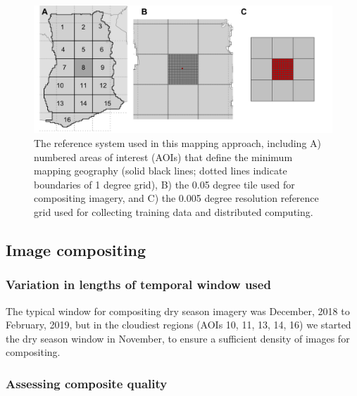 \documentclass[
  11pt,
  a4paper]{article}
\begin{document}
\begin{figure}[!ht]

{\centering \includegraphics[width=1\linewidth,]{figures/reference_system} 

}

\caption{The reference system used in this mapping approach, including A) numbered areas of interest (AOIs) that define the minimum mapping geography (solid black lines; dotted lines indicate boundaries of 1 degree grid), B) the 0.05 degree tile used for compositing imagery, and C) the 0.005 degree resolution reference grid used for collecting training data and distributed computing.}\label{fig:aois}
\end{figure}

\hypertarget{image-compositing}{%
\subsection{Image compositing}\label{image-compositing}}

\hypertarget{variation-in-lengths-of-temporal-window-used}{%
\subsubsection{Variation in lengths of temporal window
used}\label{variation-in-lengths-of-temporal-window-used}}

The typical window for compositing dry season imagery was December, 2018
to February, 2019, but in the cloudiest regions (AOIs 10, 11, 13, 14,
16) we started the dry season window in November, to ensure a sufficient
density of images for compositing.

\hypertarget{assessing-composite-quality}{%
\subsubsection{Assessing composite
quality}\label{assessing-composite-quality}}
\end{document}
